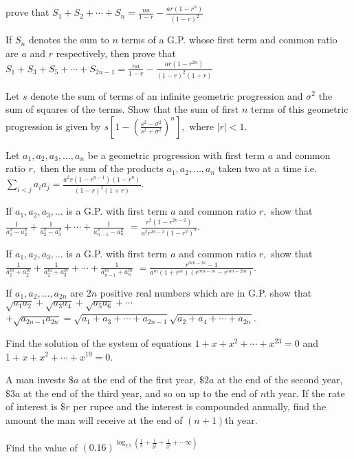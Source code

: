   prove that $S_1 + S_2 + \cdots + S_n = \frac{na}{1 - r} - \frac{ar(1 - r^n)}{(1 - r)^2}$
\item If $S_n$ denotes the sum to $n$ terms of a G.P. whose first term and common ratio are $a$ and $r$ respectively, then
  prove that $S_1 + S_3 + S_5 + \cdots + S_{2n - 1} = \frac{na}{1 - r} - \frac{ar(1 - r^{2n})}{(1 - r)^2(1 + r)}$
\item Let $s$ denote the sum of terms of an infinite geometric progression and $\sigma^2$ the sum of squares of the
  terms. Show that the sum of first $n$ terms of this geometric progression is given by $s\left[1 - \left(\frac{s^2 - \sigma^2}{s^2
      + \sigma^2}\right)^n\right],$ where $|r| < 1$.
\item Let $a_1, a_2, a_3, \ldots, a_n$ be a geometric progression with first term $a$ and common ratio $r,$ then the sum
  of the products $a_1, a_2, \ldots, a_n$ taken two at a time i.e. $\displaystyle\sum_{i < j}a_ia_j = \frac{a^2r(1 - r^{n - 1})(1 - r^n)}{(1 -
    r)^2(1 + r)}$.
\item If $a_1, a_2, a_3, \ldots$ is a G.P. with first term $a$ and common ratio $r,$ show that $\frac{1}{a_1^2 - a_2^2} +
  \frac{1}{a_2^2 - a_3^2} + \cdots + \frac{1}{a_{n - 1}^2 - a_n^2}$ $ = \frac{r^2(1 - r^{2n - 2})}{a^2r^{2n - 2}(1 - r^2)^2}$.
\item If $a_1, a_2, a_3, \ldots$ is a G.P. with first term $a$ and common ratio $r,$ show that $\frac{1}{a_1^m + a_2^m} +
  \frac{1}{a_2^m + a_3^m} + \cdots + \frac{1}{a_{n - 1}^m + a_n^m}$ $= \frac{r^{mn - m} - 1}{a^m(1 + r^m)(r^{mn - m} - r^{mn -
      2m})}$.
\item If $a_1, a_2, \ldots, a_{2n}$ are $2n$ positive real numbers which are in G.P. show that $\sqrt{a_1a_2} +
  \sqrt{a_3a_4} + \sqrt{a_5a_6} + \cdots$ $ + \sqrt{a_{2n - 1}a_{2n}} = \sqrt{a_1 + a_3 + \cdots + a_{2n - 1}}\sqrt{a_2 + a_4 +
    \cdots + a_{2n}}$.
\item Find the solution of the system of equations $1 + x + x^2 + \cdots + x^{23} = 0$ and $1 + x + x^2 + \cdots + x^{19}
  = 0$.
\item A man invests $\$a$ at the end of the first year, $\$2a$ at the end of the second year, $\$3a$ at the end of the
  third year, and so on up to the end of $n$th year. If the rate of interest is $\$r$ per rupee and the interest is compounded
  annually, find the amount the man will receive at the end of $(n + 1)$th year.
\item Find the value of $(0.16)^{\log_{2.5}\left(\frac{1}{3} + \frac{1}{3^2} + \frac{1}{3^3} + \cdots \infty\right)}$
